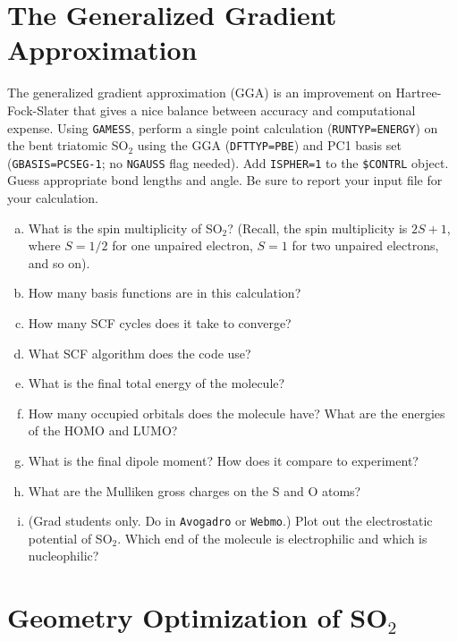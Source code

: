\documentclass[11pt]{article}
\begin{document}
\section{The Generalized Gradient Approximation}
\label{sec:orge8bd4a1}
The generalized gradient approximation (GGA) is an improvement on Hartree-Fock-Slater that gives a nice balance between accuracy and computational expense. Using \texttt{GAMESS}, perform a single point calculation (\texttt{RUNTYP=ENERGY}) on the bent triatomic SO\(_{\text{2}}\) using the GGA (\texttt{DFTTYP=PBE}) and PC1 basis set (\texttt{GBASIS=PCSEG-1}; no \texttt{NGAUSS} flag needed). Add \texttt{ISPHER=1} to the \texttt{\$CONTRL} object. Guess appropriate bond lengths and angle. Be sure to report your input file for your calculation.

\begin{enumerate}[(a)]
\item What is the spin multiplicity of SO\(_{\text{2}}\)? (Recall, the spin multiplicity is \(2S +1\), where \(S = 1/2\) for one unpaired electron, \(S = 1\) for two unpaired electrons, and so on).

\item How many basis functions are in this calculation?

\item How many SCF cycles does it take to converge?

\item What SCF algorithm does the code use?

\item What is the final total energy of the molecule?

\item How many occupied orbitals does the molecule have? What are the energies of the HOMO and LUMO?

\item What is the final dipole moment?  How does it compare to experiment?

\item What are the Mulliken gross charges on the S and O atoms?

\item (Grad students only.  Do in \texttt{Avogadro} or \texttt{Webmo}.)  Plot out the electrostatic potential of SO\(_{\text{2}}\). Which end of the molecule is electrophilic and which is nucleophilic?
\end{enumerate}


\section{Geometry Optimization of SO\(_{\text{2}}\)}
\label{sec:org7af73d0}
\end{document}
